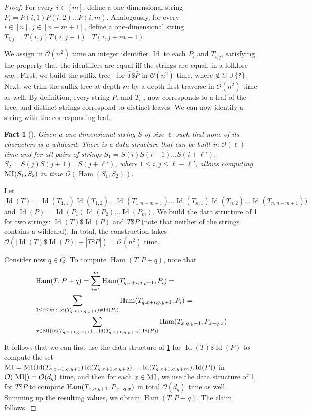 \documentclass[11pt, letterpaper]{article}
\theoremstyle{plain}
\newtheorem{fact}{Fact}
\theoremstyle{definition}
\theoremstyle{remark}
\renewcommand{\O}{\mathcal{O}}
\DeclareMathOperator*{\Ham}{Ham}
\DeclareMathOperator*{\ID}{Id}
\begin{document}
\begin{proof}
For every $i \in [m]$, define a one-dimensional string $P_i = P(i,1) P(i,2) \ldots P(i,m)$. Analogously, for every $i \in [n], j \in [n-m+1]$, define a one-dimensional string $T_{i,j} = T(i,j) T(i,j+1) \ldots T(i,j+m-1)$. 

We assign in $\O(n^2)$ time an integer identifier $\ID$ to each $P_i$ and $T_{i,j}$, satisfying the property that the identifiers are equal iff the strings are equal, in a folklore way: First, we build the suffix tree~\cite{DBLP:conf/focs/Weiner73} for $\bar{T} \$ \bar{P}$ in $\O(n^2)$ time, where $ \notin \Sigma \cup \{\texttt{?}\}$. Next, we trim the suffix tree at depth $m$ by a depth-first traverse in $\O(n^2)$ time as well. By definition, every string $P_i$ and $T_{i,j}$ now corresponds to a leaf of the tree, and distinct strings correspond to distinct leaves. We can now identify a string with the corresponding leaf. 

\begin{fact}[{\cite{Galil1986}}]\label{fact:kangaroo1D}
Given a one-dimensional string $S$ of size $\ell$ such that none of its characters is a wildcard. There is a data structure that can be built in $\O(\ell)$ time and for all pairs of strings $S_1 = S(i) S(i+1) \ldots S(i+\ell')$, $S_2 = S(j) S(j+1) \ldots S(j+\ell')$, where $1 \le i,j \le \ell-\ell'$, allows computing $\textsc{MI}(S_1, S_2)$ in time $\O(\Ham(S_1,S_2))$. 
\end{fact}

Let $\ID(T) = \ID(T_{1,1}) \ID(T_{1,2}) \ldots \ID(T_{1,n-m+1}) \ldots \ID(T_{n,1}) \ID(T_{n,2}) \ldots \ID(T_{n,n-m+1}))$ and $\ID(P) = \ID(P_1)\ID(P_2) \ldots \ID(P_m)$. 
We build the data structure of \cref{fact:kangaroo1D} for two strings: $\ID(T) \$ \ID(P)$ and $\bar{T} \$ \bar{P}$ (note that neither of the strings contains a wildcard). In total, the construction takes $\O(|\ID(T) \$ \ID(P)| + |\bar{T} \$ \bar{P}|) = \O(n^2)$ time.

Consider now $q \in Q$. To compute $\Ham(T, P+q)$, note that 

\begin{align*}
&\Ham(T, P+q) = \sum_{i=1}^m \Ham(T_{\x{q}+i, \y{q}+1}, P_i)=\\
&\sum_{1 \le i \le m \; : \; \ID(T_{\x{q}+i, \y{q}+1}) \neq \ID(P_i)} \Ham(T_{\x{q}+i, \y{q}+1}, P_i) = \\
&\sum_{x \in \MI(\ID(T_{\x{q}+1, \y{q}+1}) \ldots \ID(T_{\x{q}+1, \y{q}+m}), \ID(P))} \Ham(T_{x, \y{q}+1}, P_{x-\x{q}})\\
\end{align*}

It follows that we can first use the data structure of \cref{fact:kangaroo1D} for  $\ID(T) \$ \ID(P)$ to compute the set $\MI =  \MI(\ID(T_{\x{q}+1, \y{q}+1}) \ID(T_{\x{q}+1, \y{q}+2}) \ldots \ID(T_{\x{q}+1, \y{q}+m}), \ID(P))$ in $\O(|\MI|) = \O(d_q)$ time, and then for each $x \in \textsc{MI}$, we use the data structure of  \cref{fact:kangaroo1D}  for $\bar{T} \$ \bar{P}$ to compute 
$\Ham(T_{x, \y{q}+1}, P_{x-\x{q}})$ in total $\O(d_q)$ time as well. Summing up the resulting values, we obtain $\Ham(T, P+q)$. The claim follows. 
\end{proof}
\end{document}
